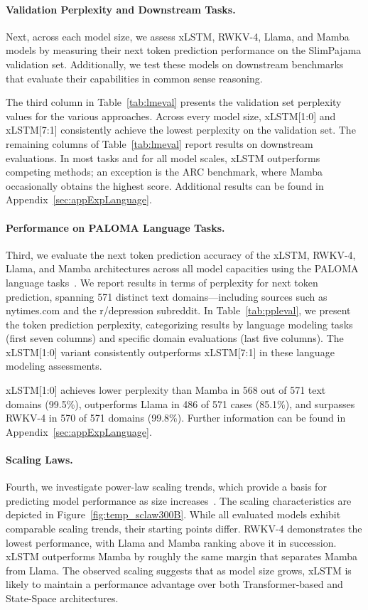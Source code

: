 \paragraph{Validation Perplexity and Downstream Tasks.}
\label{sec:spaj_downstream_eval}
Next, across each model size, we assess xLSTM, RWKV-4, Llama, and Mamba models by measuring their next token prediction performance on the SlimPajama validation set. Additionally, we test these models on downstream benchmarks that evaluate their capabilities in common sense reasoning.

The third column in Table~\ref{tab:lmeval} presents the validation set perplexity values for the various approaches. Across every model size, xLSTM[1:0] and xLSTM[7:1] consistently achieve the lowest perplexity on the validation set. The remaining columns of Table~\ref{tab:lmeval} report results on downstream evaluations. In most tasks and for all model scales, xLSTM outperforms competing methods; an exception is the ARC benchmark, where Mamba occasionally obtains the highest score. Additional results can be found in Appendix~\ref{sec:appExpLanguage}.

\paragraph{Performance on PALOMA Language Tasks.} Third, we evaluate the next token prediction accuracy of the xLSTM, RWKV-4, Llama, and Mamba architectures across all model capacities using the PALOMA language tasks~\citep{Magnusson:23arxivshort}. We report results in terms of perplexity for next token prediction, spanning 571 distinct text domains—including sources such as nytimes.com and the r/depression subreddit. In Table~\ref{tab:ppleval}, we present the token prediction perplexity, categorizing results by language modeling tasks (first seven columns) and specific domain evaluations (last five columns). The xLSTM[1:0] variant consistently outperforms xLSTM[7:1] in these language modeling assessments.

xLSTM[1:0] achieves lower perplexity than Mamba in 568 out of 571 text domains (99.5\%), outperforms Llama in 486 of 571 cases (85.1\%), and surpasses RWKV-4 in 570 of 571 domains (99.8\%). Further information can be found in Appendix~\ref{sec:appExpLanguage}.

\paragraph{Scaling Laws.} Fourth, we investigate power-law scaling trends, which provide a basis for predicting model performance as size increases~\citep{Kaplan:20,Brown:20short}. The scaling characteristics are depicted in Figure~\ref{fig:temp_sclaw300B}. While all evaluated models exhibit comparable scaling trends, their starting points differ. RWKV-4 demonstrates the lowest performance, with Llama and Mamba ranking above it in succession. xLSTM outperforms Mamba by roughly the same margin that separates Mamba from Llama. The observed scaling suggests that as model size grows, xLSTM is likely to maintain a performance advantage over both Transformer-based and State-Space architectures.

